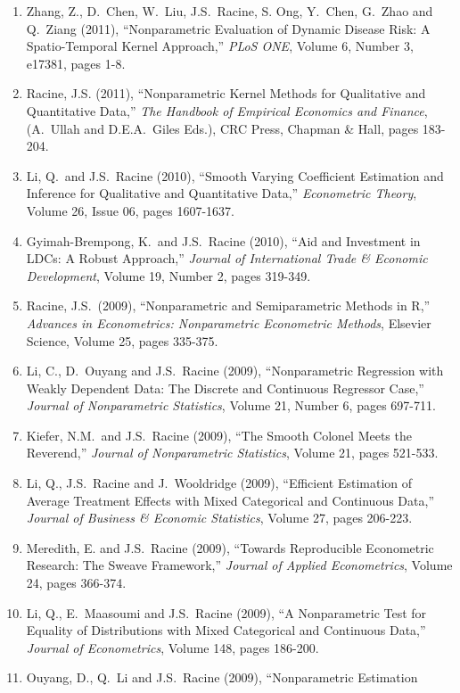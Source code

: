 \documentclass[
]{article}
\begin{document}
\begin{enumerate}
\item
  Zhang, Z., D.~Chen, W.~Liu, J.S.~Racine, S. Ong, Y.~Chen, G.~Zhao and
  Q.~Ziang (2011), ``Nonparametric Evaluation of Dynamic Disease Risk: A
  Spatio-Temporal Kernel Approach,'' \emph{PLoS ONE}, Volume 6, Number
  3, e17381, pages 1-8.
\item
  Racine, J.S. (2011), ``Nonparametric Kernel Methods for Qualitative
  and Quantitative Data,'' \emph{The Handbook of Empirical Economics and
  Finance}, (A.~Ullah and D.E.A.~Giles Eds.), CRC Press, Chapman \&
  Hall, pages 183-204.
\item
  Li, Q.~and J.S.~Racine (2010), ``Smooth Varying Coefficient Estimation
  and Inference for Qualitative and Quantitative Data,''
  \emph{Econometric Theory}, Volume 26, Issue 06, pages 1607-1637.
\item
  Gyimah-Brempong, K.~and J.S.~Racine (2010), ``Aid and Investment in
  LDCs: A Robust Approach,'' \emph{Journal of International Trade \&
  Economic Development}, Volume 19, Number 2, pages 319-349.
\item
  Racine, J.S.~(2009), ``Nonparametric and Semiparametric Methods in
  R,'' \emph{Advances in Econometrics: Nonparametric Econometric
  Methods}, Elsevier Science, Volume 25, pages 335-375.
\item
  Li, C., D.~Ouyang and J.S.~Racine (2009), ``Nonparametric Regression
  with Weakly Dependent Data: The Discrete and Continuous Regressor
  Case,'' \emph{Journal of Nonparametric Statistics}, Volume 21, Number
  6, pages 697-711.
\item
  Kiefer, N.M.~and J.S.~Racine (2009), ``The Smooth Colonel Meets the
  Reverend,'' \emph{Journal of Nonparametric Statistics}, Volume 21,
  pages 521-533.
\item
  Li, Q., J.S.~Racine and J.~Wooldridge (2009), ``Efficient Estimation
  of Average Treatment Effects with Mixed Categorical and Continuous
  Data,'' \emph{Journal of Business \& Economic Statistics}, Volume 27,
  pages 206-223.
\item
  Meredith, E. and J.S.~Racine (2009), ``Towards Reproducible
  Econometric Research: The Sweave Framework,'' \emph{Journal of Applied
  Econometrics}, Volume 24, pages 366-374.
\item
  Li, Q., E.~Maasoumi and J.S.~Racine (2009), ``A Nonparametric Test for
  Equality of Distributions with Mixed Categorical and Continuous
  Data,'' \emph{Journal of Econometrics}, Volume 148, pages 186-200.
\item
  Ouyang, D., Q.~Li and J.S.~Racine (2009), ``Nonparametric Estimation

\end{enumerate}
\end{document}
